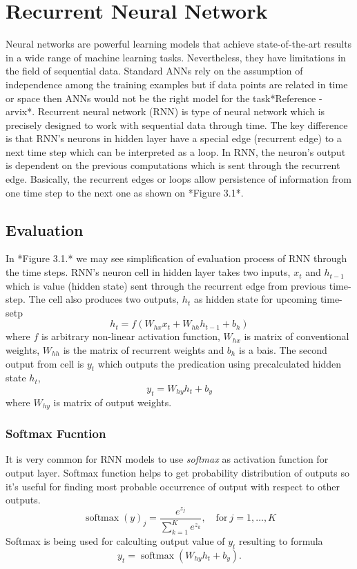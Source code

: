 \chapter{Recurrent Neural Network}

Neural networks are powerful learning models that achieve state-of-the-art results in a wide range of machine learning tasks.
Nevertheless, they have limitations in the field of sequential data.
Standard ANNs rely on the assumption of independence among the training examples but if data points are related in time or space then ANNs would not be the right model for the task*Reference - arvix*.
\newline
Recurrent neural network (RNN) is type of neural network which is precisely designed to work with sequential data through time.
The key difference is that RNN's neurons in hidden layer have a special edge (recurrent edge) to a next time step which can be interpreted as a loop.
In RNN, the neuron's output is dependent on the previous computations which is sent through the recurrent edge.
Basically, the recurrent edges or loops allow persistence of information from one time step to the next one as shown on *Figure 3.1*.


\section{Evaluation}

In *Figure 3.1.* we may see simplification of evaluation process of RNN through the time steps.
RNN's neuron cell in hidden layer takes two inputs, $x_t$ and $h_{t-1}$ which is value (hidden state) sent through the recurrent edge from previous time-step.
The cell also produces two outputs, $h_t$ as hidden state for upcoming time-setp
\[ h_t = f(W_{hx}x_t + W_{hh}h_{t-1} + b_h) \]
where $f$ is arbitrary non-linear activation function, $W_{hx}$ is matrix of conventional weights, $W_{hh}$ is the matrix of recurrent weights and $b_h$ is a bais.
The second output from cell is $y_t$ which outputs the predication using precalculated hidden state $h_t$,
\[ y_t = W_{hy}h_t + b_y \]
where $W_{hy}$ is matrix of output weights.

\subsection{Softmax Fucntion}
It is very common for RNN models to use \textit{softmax} as activation function for output layer.
Softmax function helps to get probability distribution of outputs so it's useful for finding most probable occurrence of output with respect to other outputs.
\[ \operatorname{softmax}(y)_j = \frac{e^{z_j}}{\sum_{k=1}^K e^{z_k}}, \quad \text{for} \ j = 1, \ldots,  K \]
Softmax is being used for calculting output value of $y_t$ resulting to formula
\[ y_t = \operatorname{softmax}(W_{hy}h_t + b_y). \]


